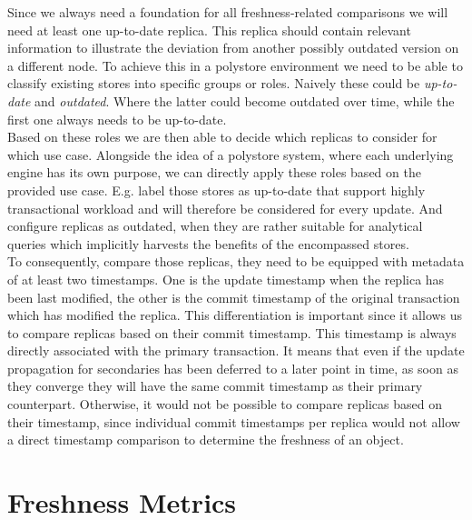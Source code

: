 Since we always need a foundation for all freshness-related comparisons we will need at least one up-to-date replica. 
This replica should contain relevant information to illustrate the deviation from another possibly outdated version on a different node.
To achieve this in a polystore environment we need to be able to classify existing stores into specific groups or roles.
Naively these could be \emph{up-to-date} and \emph{outdated}. Where the latter could become outdated over time, while the first one always needs to be up-to-date. \\
Based on these roles we are then able to decide which replicas to consider for which use case.
Alongside the idea of a polystore system, where each underlying engine has its own purpose, we can directly apply these roles 
based on the provided use case. E.g. label those stores as up-to-date that support highly transactional workload and will therefore be considered for every update.
And configure replicas as outdated, when they are rather suitable for analytical queries which implicitly harvests the benefits of the encompassed stores. \\

To consequently, compare those replicas, they need to be equipped with metadata of at least two timestamps. 
One is the update timestamp when the replica has been last modified,
the other is the commit timestamp of the original transaction which has modified the replica.
This differentiation is important since it allows us to compare replicas based on their commit timestamp. This timestamp is always directly associated with the primary transaction.
It means that even if the update propagation for secondaries has been deferred to a later point in time, as soon as they converge they will have the same commit timestamp 
as their primary counterpart.
Otherwise, it would not be possible to compare replicas based on their timestamp, since individual commit timestamps per replica would not allow a direct timestamp comparison 
to determine the freshness of an object.



\section{Freshness Metrics}
\label{sec:freshne_metrics}

